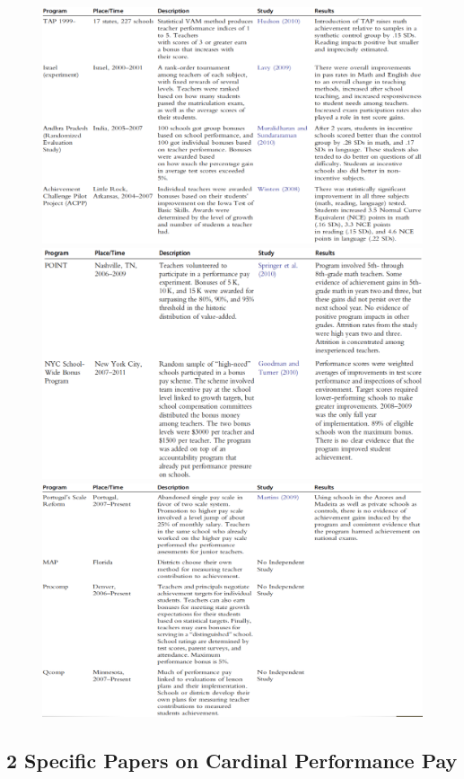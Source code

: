         \begin{figure}[H]
            \centering
            \includegraphics[width=4.5in]{images/ch10/10 pp 3.png}
            \includegraphics[width=4.5in]{images/ch10/10 pp 4.png}
            \includegraphics[width=4.5in]{images/ch10/10 pp 5.png}
        \end{figure}

    \subsection{2 Specific Papers on Cardinal Performance Pay}
